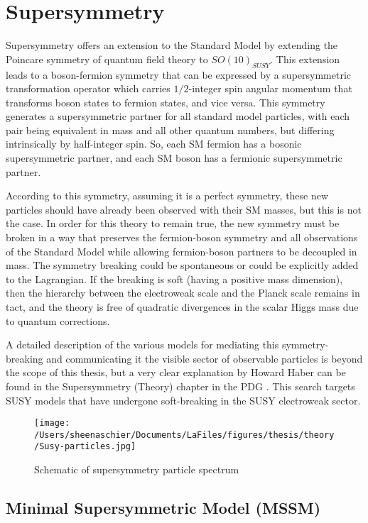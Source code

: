 \section{Supersymmetry}
\label{sec:susy}
Supersymmetry offers an extension to the Standard Model by extending the Poincare symmetry of quantum field theory to $SO(10)_{SUSY}$.  This extension leads to a boson-fermion symmetry that can be expressed by a supersymmetric transformation operator which carries $1/2$-integer spin angular momentum that transforms boson states to fermion states, and vice versa.  This symmetry generates a supersymmetric partner for all standard model particles, with each pair being equivalent in mass and all other quantum numbers, but differing intrinsically by half-integer spin.  So, each SM fermion has a bosonic supersymmetric partner, and each SM boson has a fermionic supersymmetric partner.  

According to this symmetry, assuming it is a perfect symmetry, these new particles should have already been observed with their SM masses, but this is not the case.  In order for this theory to remain true, the new symmetry must be broken in a way that preserves the fermion-boson symmetry and all observations of the Standard Model while allowing fermion-boson partners to be decoupled in mass.  The symmetry breaking could be spontaneous or could be explicitly added to the Lagrangian.  If the breaking is soft (having a positive mass dimension), then the hierarchy between the electroweak scale and the Planck scale remains in tact, and the theory is free of quadratic divergences in the scalar Higgs mass due to quantum corrections.  

A detailed description of the various models for mediating this symmetry-breaking and communicating it the visible sector of observable particles is beyond the scope of this thesis, but a very clear explanation by Howard Haber can be found in the Supersymmetry (Theory) chapter in the PDG \cite{haber}.   This search targets SUSY models that have undergone soft-breaking in the SUSY electroweak sector. 

  \begin{figure}[tbp]
    \centering
 \texttt{[image: /Users/sheenaschier/Documents/LaFiles/figures/thesis/theory/Susy-particles.jpg]}
    \caption{Schematic of supersymmetry particle spectrum}
   \label{fig:susy}
 \end{figure}

\subsection{Minimal Supersymmetric Model (MSSM)}

